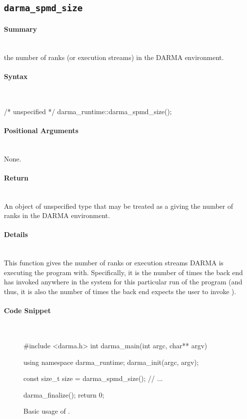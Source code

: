 \subsection{\texttt{darma\_spmd\_size}}


\paragraph{Summary}\mbox{}\\
 the number of \glspl{rank} (or \glspl{execution
stream}) in the \gls{DARMA} environment.

\paragraph{Syntax}\mbox{}\\
\begin{CppCode}
/* unspecified */ darma_runtime::darma_spmd_size();
\end{CppCode}

\paragraph{Positional Arguments} \mbox{}\\
None. 

\paragraph{Return} \mbox{}\\
An object of unspecified type that may be treated as a 
giving the number of \glspl{rank} in the \gls{DARMA} environment.

\paragraph{Details} \mbox{}\\
This function gives the number of \glspl{rank} or \glspl{execution stream}
\gls{DARMA} is executing the program with. 
Specifically, it is the number of times the 
back end has invoked
 anywhere in the system for this particular run of the
program (and thus, it is also the number of times the
back end expects the user
to invoke ).

\paragraph{Code Snippet} \mbox{}\\
\begin{figure}[!h]
\begin{CppCodeNumb}
#include <darma.h>
int darma_main(int argc, char** argv)
{
  using namespace darma_runtime;
  darma_init(argc, argv);

  const size_t size = darma_spmd_size();
  // ...

  darma_finalize();
  return 0;
}
\end{CppCodeNumb}
\label{fig:fe_api_ranksize}
  \caption{Basic usage of \protect{}.}
\end{figure}


